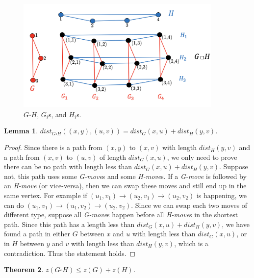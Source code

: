 \documentclass[1p]{elsarticle}
\newtheorem{theorem}{Theorem}
\newtheorem{lemma}[theorem]{Lemma}
\begin{document}
\begin{figure}[h!]
	
	\centering
	\includegraphics[width=0.9\textwidth]{fig/cp3.png}
	\caption{$G \square H$, $G_i$s, and $H_i$s.}
	\label{fig:p1}
\end{figure}



\begin{lemma} \label{shortestpathlemma}
	$dist_{G \square H}((x,y),(u,v)) = dist_G(x,u) + dist_H(y,v)$.
\end{lemma}
\begin{proof}
	Since there is a path from $(x,y)$ to $(x,v)$ with length $dist_H(y,v)$ and a path from $(x,v)$ to $(u,v)$ of length
	$dist_G(x,u)$, we only need to prove there can be no path with length less than $dist_G(x,u) + dist_H(y,v)$.
	Suppose not, this path uses some {\it G-move}s and some {\it H-move}s. If a {\it G-move} is followed by an {\it
	H-move} (or vice-versa), then we can swap these moves and still end up in the same vertex. For example if $(u_1,v_1)
	\rightarrow (u_2,v_1) \rightarrow (u_2,v_2)$ is happening, we can do $(u_1,v_1) \rightarrow (u_1,v_2) \rightarrow
	(u_2,v_2)$. Since we can swap each two moves of different type, suppose all {\it G-move}s happen before all {\it
	H-move}s in the shortest path. Since this path has a length less than $dist_G(x,u) + dist_H(y,v)$, we have found a
	path in either $G$ between $x$ and $u$ with length less than $dist_G(x,u)$, or in $H$ between $y$ and $v$ with
	length less than $dist_H(y,v)$, which is a contradiction. Thus the statement holds.
\end{proof}




\begin{theorem}
	$z(G \square H) \leq z(G) + z(H)$.
\end{theorem}
\end{document}
